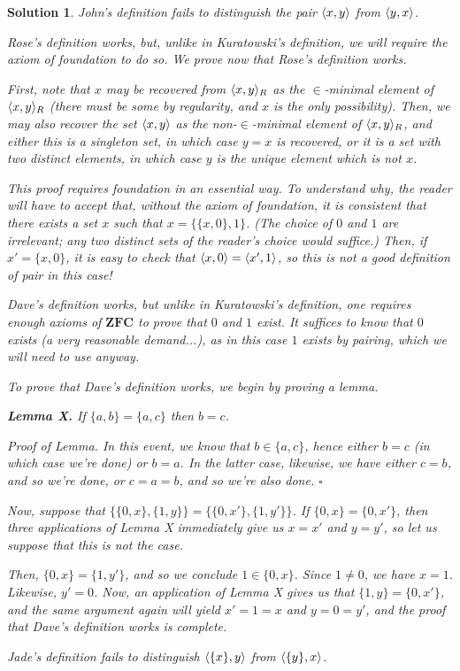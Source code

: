 \documentclass{article}
\theoremstyle{nonumberplain}
\newtheorem{sol}{Solution}
\DeclarePairedDelimiter{\braket}{\langle}{\rangle}
\newcommand{\ZFC}{\mathbf{ZFC}}
\begin{document}
\begin{sol}
John's definition fails to distinguish the pair $\braket{x,y}$ from $\braket{y,x}$.

\smallskip

Rose's definition works, but, unlike in Kuratowski's definition, we will require the axiom of foundation to do so. We prove now that Rose's definition works.

First, note that $x$ may be recovered from $\braket{x,y}_R$ as the $\in$-minimal element of $\braket{x,y}_R$ (there must be some by regularity, and $x$ is the only possibility). Then, we may also recover the set $\braket{x,y}$ as the non-$\in$-minimal element of $\braket{x,y}_R$, and either this is a singleton set, in which case $y = x$ is recovered, or it is a set with two distinct elements, in which case $y$ is the unique element which is not $x$.

This proof requires foundation in an essential way. To understand why, the reader will have to accept that, without the axiom of foundation, it is consistent that there exists a set $x$ such that $x = \{\{x,0\}, 1\}$. (The choice of $0$ and $1$ are irrelevant; any two distinct sets of the reader's choice would suffice.) Then, if $x' = \{x,0\}$, it is easy to check that $\braket{x, 0} = \braket{x', 1}$, so this is not a good definition of pair in this case!

\smallskip

Dave's definition works, but unlike in Kuratowski's definition, one requires enough axioms of $\ZFC$ to prove that $0$ and $1$ exist. It suffices to know that $0$ exists (a very reasonable demand...), as in this case $1$ exists by pairing, which we will need to use anyway.

To prove that Dave's definition works, we begin by proving a lemma.

\textbf{Lemma X.} If $\{a,b\} = \{a,c\}$ then $b=c$.

\textit{Proof of Lemma.} In this event, we know that $b \in \{a,c\}$, hence either $b=c$ (in which case we're done) or $b = a$. In the latter case, likewise, we have either $c=b$, and so we're done, or $c = a = b$, and so we're also done. \hfill $\square$

Now, suppose that $\{\{0,x\},\{1,y\}\} = \{\{0,x'\},\{1,y'\}\}$. If $\{0,x\} = \{0,x'\}$, then three applications of Lemma X immediately give us $x = x'$ and $y = y'$, so let us suppose that this is not the case.

Then, $\{0,x\} = \{1,y'\}$, and so we conclude $1 \in \{0,x\}$. Since $1 \neq 0$, we have $x = 1$. Likewise, $y' = 0$. Now, an application of Lemma X gives us that $\{1,y\} = \{0,x'\}$, and the same argument again will yield $x' = 1 = x$ and $y = 0 = y'$, and the proof that Dave's definition works is complete.

\smallskip

Jade's definition fails to distinguish $\braket{\{x\}, y}$ from $\braket{\{y\}, x}$.
\end{sol}
\end{document}
